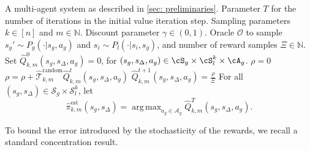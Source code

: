 \documentclass{article}
\theoremstyle{plain}
\theoremstyle{definition}
\def\est{\mathrm{est}}
\def\N{\mathbb{N}}
\DeclareMathOperator*{\argmax}{arg\,max}
\begin{document}
\begin{algorithm}[H]
\caption{\texttt{ALTERNATING-MARL}: Learning with Stochastic Rewards}\label{algorithm: approx-dense-tolerable-Q-learning_random_rewards}
\begin{algorithmic}[1]
\REQUIRE A multi-agent system as described in \cref{sec: preliminaries}.
Parameter $T$ for the number of iterations in the initial value iteration step. Sampling parameters $k \in [n]$ and $m\in \N$. Discount parameter $\gamma\in (0,1)$. Oracle $\mathcal{O}$ to sample $s_g'\sim {P}_g(\cdot|s_g,a_g)$ and $s_i\sim {P}_l(\cdot|s_i,s_g)$, and number of reward samples $\Xi\in\N$.
\STATE Set $\hat{Q}^0_{k,m}(s_g,s_\Delta, a_g)=0$, for $(s_g,s_\Delta,a_g)\in\cS_g\times\cS_l^k\times\cA_g$.
\STATE $\rho=0$
\STATE $\rho = \rho + \hat{\mathcal{T}}^{\text{random}}_{k,m} \hat{Q}^t_{k,m}(s_g, s_\Delta, a_g)$
\ENDFOR
\STATE $\hat{Q}^{t+1}_{k,m}(s_g, s_\Delta, a_g) = \frac\rho\Xi$
\ENDFOR
\ENDFOR
\STATE For all $(s_g,s_\Delta) \in \mathcal{S}_g\times \mathcal{S}_l^k$, let \[\hat{\pi}_{k,m}^\est(s_g,s_\Delta) = \mathop{\argmax}_{a_g\in\mathcal{A}_g}\hat{Q}_{k,m}^T(s_g, s_\Delta, a_g).\]
\end{algorithmic}
\end{algorithm} 

To bound the error introduced by the stochasticity of the rewards, we recall a standard concentration result.
\end{document}
